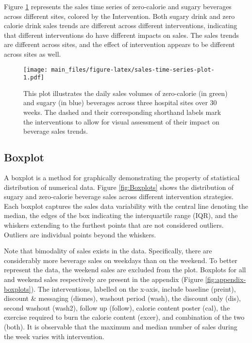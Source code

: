 \documentclass[
]{article}
\begin{document}
Figure \ref{fig:sales-time-series-plot} represents the sales time series of zero-calorie and sugary beverages across different sites, colored by the Intervention. Both sugary drink and zero calorie drink sales trends are different across different interventions, indicating that different interventions do have different impacts on sales. The sales trends are different across sites, and the effect of intervention appears to be different across sites as well.

\begin{figure}
\centering
\texttt{[image: main\_files/figure-latex/sales-time-series-plot-1.pdf]}
\caption{\label{fig:sales-time-series-plot}This plot illustrates the daily sales volumes of zero-calorie (in green) and sugary (in blue) beverages across three hospital sites over 30 weeks. The dashed and their corresponding shorthand labels mark the interventions to allow for visual assessment of their impact on beverage sales trends.}
\end{figure}

\hypertarget{boxplot}{%
\subsection{Boxplot}\label{boxplot}}

A boxplot is a method for graphically demonstrating the property of statistical distribution of numerical data. Figure \ref{fig:Boxplots} shows the distribution of sugary and zero-calorie beverage sales across different intervention strategies. Each boxplot captures the sales data variability with the central line denoting the median, the edges of the box indicating the interquartile range (IQR), and the whiskers extending to the furthest points that are not considered outliers. Outliers are individual points beyond the whiskers.

Note that bimodality of sales exists in the data. Specifically, there are considerably more beverage sales on weekdays than on the weekend. To better represent the data, the weekend sales are excluded from the plot. Boxplots for all and weekend sales respectively are present in the appendix (Figure \ref{fig:appendix-boxplots}). The interventions, labelled on the x-axis, include baseline (preint), discount \& messaging (dismes), washout period (wash), the discount only (dis), second washout (wash2), follow up (follow), calorie content poster (cal), the exercise required to burn the calorie content (excer), and combination of the two (both). It is observable that the maximum and median number of sales during the week varies with intervention.
\end{document}

